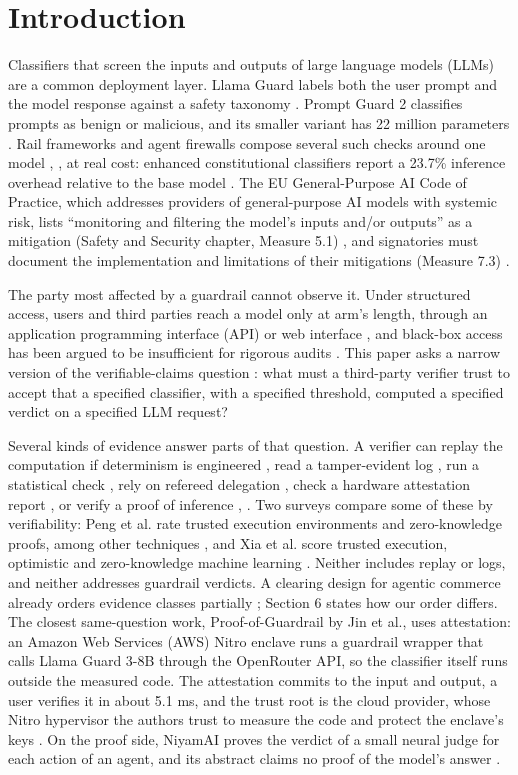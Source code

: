 \documentclass[11pt]{article}
\begin{document}
\section{Introduction}

Classifiers that screen the inputs and outputs of large language models (LLMs) are a common deployment layer. Llama Guard labels both the user prompt and the model response against a safety taxonomy \cite{D1}. Prompt Guard 2 classifies prompts as benign or malicious, and its smaller variant has 22 million parameters \cite{D6}. Rail frameworks and agent firewalls compose several such checks around one model \cite{D11}, \cite{D7}, at real cost: enhanced constitutional classifiers report a 23.7\% inference overhead relative to the base model \cite{D13}. The EU General-Purpose AI Code of Practice, which addresses providers of general-purpose AI models with systemic risk, lists ``monitoring and filtering the model's inputs and/or outputs'' as a mitigation (Safety and Security chapter, Measure 5.1) \cite{D24}, and signatories must document the implementation and limitations of their mitigations (Measure 7.3) \cite{D24}.

The party most affected by a guardrail cannot observe it. Under structured access, users and third parties reach a model only at arm's length, through an application programming interface (API) or web interface \cite{D17}, and black-box access has been argued to be insufficient for rigorous audits \cite{D18}. This paper asks a narrow version of the verifiable-claims question \cite{D14}: what must a third-party verifier trust to accept that a specified classifier, with a specified threshold, computed a specified verdict on a specified LLM request?

Several kinds of evidence answer parts of that question. A verifier can replay the computation if determinism is engineered \cite{C1}, read a tamper-evident log \cite{C18}, run a statistical check \cite{C11}, rely on refereed delegation \cite{C10}, check a hardware attestation report \cite{B2}, or verify a proof of inference \cite{A5}, \cite{A17}. Two surveys compare some of these by verifiability: Peng et al. rate trusted execution environments and zero-knowledge proofs, among other techniques \cite{A32}, and Xia et al. score trusted execution, optimistic and zero-knowledge machine learning \cite{A35}. Neither includes replay or logs, and neither addresses guardrail verdicts. A clearing design for agentic commerce already orders evidence classes partially \cite{F9}; Section 6 states how our order differs. The closest same-question work, Proof-of-Guardrail by Jin et al., uses attestation: an Amazon Web Services (AWS) Nitro enclave runs a guardrail wrapper that calls Llama Guard 3-8B through the OpenRouter API, so the classifier itself runs outside the measured code. The attestation commits to the input and output, a user verifies it in about 5.1 ms, and the trust root is the cloud provider, whose Nitro hypervisor the authors trust to measure the code and protect the enclave's keys \cite{B24}. On the proof side, NiyamAI proves the verdict of a small neural judge for each action of an agent, and its abstract claims no proof of the model's answer \cite{A44}.
\end{document}
